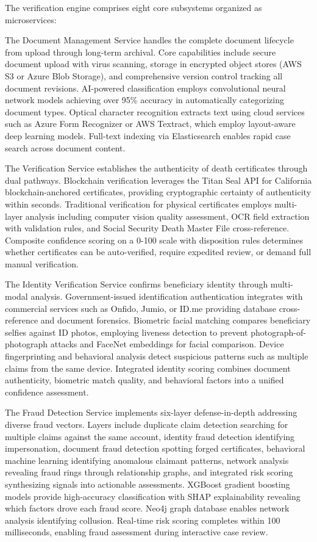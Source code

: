 The verification engine comprises eight core subsystems organized as microservices:

The Document Management Service handles the complete document lifecycle from upload through long-term archival. Core capabilities include secure document upload with virus scanning, storage in encrypted object stores (AWS S3 or Azure Blob Storage), and comprehensive version control tracking all document revisions. AI-powered classification employs convolutional neural network models achieving over 95\% accuracy in automatically categorizing document types. Optical character recognition extracts text using cloud services such as Azure Form Recognizer or AWS Textract, which employ layout-aware deep learning models. Full-text indexing via Elasticsearch enables rapid case search across document content.

The Verification Service establishes the authenticity of death certificates through dual pathways. Blockchain verification leverages the Titan Seal API for California blockchain-anchored certificates, providing cryptographic certainty of authenticity within seconds. Traditional verification for physical certificates employs multi-layer analysis including computer vision quality assessment, OCR field extraction with validation rules, and Social Security Death Master File cross-reference. Composite confidence scoring on a 0-100 scale with disposition rules determines whether certificates can be auto-verified, require expedited review, or demand full manual verification.

The Identity Verification Service confirms beneficiary identity through multi-modal analysis. Government-issued identification authentication integrates with commercial services such as Onfido, Jumio, or ID.me providing database cross-reference and document forensics. Biometric facial matching compares beneficiary selfies against ID photos, employing liveness detection to prevent photograph-of-photograph attacks and FaceNet embeddings for facial comparison. Device fingerprinting and behavioral analysis detect suspicious patterns such as multiple claims from the same device. Integrated identity scoring combines document authenticity, biometric match quality, and behavioral factors into a unified confidence assessment.

The Fraud Detection Service implements six-layer defense-in-depth addressing diverse fraud vectors. Layers include duplicate claim detection searching for multiple claims against the same account, identity fraud detection identifying impersonation, document fraud detection spotting forged certificates, behavioral machine learning identifying anomalous claimant patterns, network analysis revealing fraud rings through relationship graphs, and integrated risk scoring synthesizing signals into actionable assessments. XGBoost gradient boosting models provide high-accuracy classification with SHAP explainability revealing which factors drove each fraud score. Neo4j graph database enables network analysis identifying collusion. Real-time risk scoring completes within 100 milliseconds, enabling fraud assessment during interactive case review.

